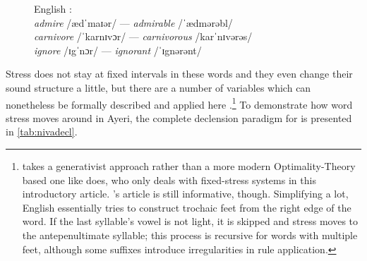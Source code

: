 \begin{figure}[h]
\ex\label{ex:engvarstress}%
	English \citep[adapted from][552]{halle1998}:\medskip\\
	\textit{admire} /ædˈmaɪər/ --- \textit{admirable} /ˈædmərəbl/\\
	\textit{carnivore} /ˈkarnɪvɔr/ --- \textit{carnivorous} /karˈnɪvərəs/\\
	\textit{ignore} /ɪgˈnɔr/ --- \textit{ignorant} /ˈɪgnərənt/
\xe
\end{figure}

Stress does not stay at fixed intervals in these words and they even change
their sound structure a little, but there are a number of variables which can
nonetheless be formally described and applied here
\citep[564--565]{halle1998}.\footnote{\citet{halle1998} takes a generativist
approach rather than a more modern Optimality-Theory based one like
\citet{kager2007} does, who only deals with fixed-stress systems in this
introductory article. \citeauthor{halle1998}'s article is still informative,
though. Simplifying a lot, English essentially tries to construct trochaic feet
from the right edge of the word. If the last syllable's vowel is not light, it
is skipped and stress moves to the antepenultimate syllable; this process is
recursive for words with multiple feet, although some suffixes introduce
irregularities in rule application.} To demonstrate how word stress moves
around in Ayeri, the complete declension paradigm for
 is presented in \autoref{tab:nivadecl}.

